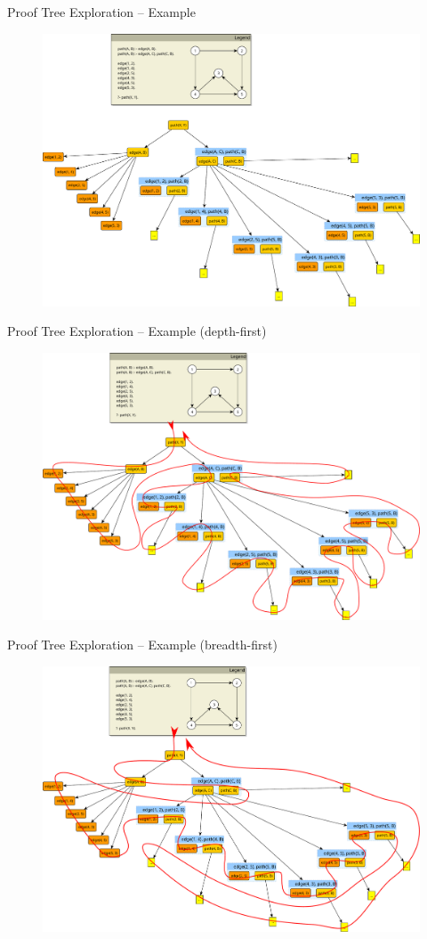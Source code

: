 \documentclass[presentation]{beamer}\mode<presentation>{\usetheme{AMSBolognaFC}}
\begin{document}
\begin{frame}{Proof Tree Exploration -- Example}
    \begin{figure}
        \centering
        \includegraphics[width=.8\linewidth]{figures/exploration.pdf}
    \end{figure}
\end{frame}

\begin{frame}{Proof Tree Exploration -- Example (depth-first)}
    \begin{figure}
        \centering
        \includegraphics[width=.7\linewidth]{figures/exploration-df.pdf}
    \end{figure}
\end{frame}

\begin{frame}{Proof Tree Exploration -- Example (breadth-first)}
    \begin{figure}
        \centering
        \includegraphics[width=.7\linewidth]{figures/exploration-bf.pdf}
    \end{figure}
\end{frame}
\end{document}
